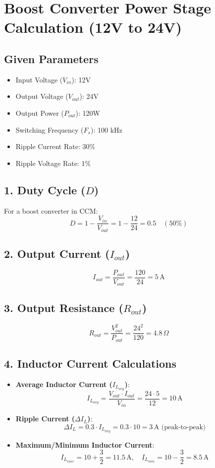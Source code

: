 \documentclass{article}
\begin{document}
	
	\section*{Boost Converter Power Stage Calculation (12V to 24V)}
	
	\subsection*{Given Parameters}
	\begin{itemize}
		\item Input Voltage (\(V_{in}\)): 12V  
		\item Output Voltage (\(V_{out}\)): 24V  
		\item Output Power (\(P_{out}\)): 120W  
		\item Switching Frequency (\(F_s\)): 100 kHz  
		\item Ripple Current Rate: 30\%  
		\item Ripple Voltage Rate: 1\%  
	\end{itemize}
	
	\subsection*{1. Duty Cycle (\(D\))}
	For a boost converter in CCM:
	\[
	D = 1 - \frac{V_{in}}{V_{out}} = 1 - \frac{12}{24} = 0.5 \quad (\text{50\%})
	\]
	
	\subsection*{2. Output Current (\(I_{out}\))}
	\[
	I_{out} = \frac{P_{out}}{V_{out}} = \frac{120}{24} = 5 \, \text{A}
	\]
	
	\subsection*{3. Output Resistance (\(R_{out}\))}
	\[
	R_{out} = \frac{V_{out}^2}{P_{out}} = \frac{24^2}{120} = 4.8 \, \Omega
	\]
	
	\subsection*{4. Inductor Current Calculations}
	\begin{itemize}
		\item \textbf{Average Inductor Current (\(I_{L_{avg}}\))}:
		\[
		I_{L_{avg}} = \frac{V_{out} \cdot I_{out}}{V_{in}} = \frac{24 \cdot 5}{12} = 10 \, \text{A}
		\]
		
		\item \textbf{Ripple Current (\(\Delta I_L\))}:
		\[
		\Delta I_L = 0.3 \cdot I_{L_{avg}} = 0.3 \cdot 10 = 3 \, \text{A (peak-to-peak)}
		\]
		
		\item \textbf{Maximum/Minimum Inductor Current}:
		\[
		I_{L_{max}} = 10 + \frac{3}{2} = 11.5 \, \text{A}, \quad 
		I_{L_{min}} = 10 - \frac{3}{2} = 8.5 \, \text{A}
		\]
	\end{itemize}
	
\end{document}
